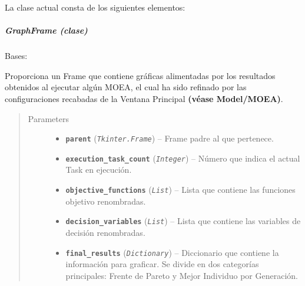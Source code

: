 \documentclass[letterpaper,10pt,english]{sphinxmanual}
\begin{document}
La clase actual consta de los siguientes elementos:


\subparagraph{GraphFrame (clase)}
\label{View/Additional/ResultsGrapher/GraphFrame:graphframe-clase}\label{View/Additional/ResultsGrapher/GraphFrame::doc}\label{View/Additional/ResultsGrapher/GraphFrame:module-View.Additional.ResultsGrapher.GraphFrame}

\begin{fulllineitems}
\label{View/Additional/ResultsGrapher/GraphFrame:View.Additional.ResultsGrapher.GraphFrame.GraphFrame}
Bases: 

Proporciona un Frame que contiene gráficas alimentadas por los resultados obtenidos
al ejecutar algún MOEA, el cual ha sido refinado por las configuraciones
recabadas de la Ventana Principal \textbf{(véase Model/MOEA)}.
\begin{quote}\begin{description}
\item[{Parameters}] \leavevmode\begin{itemize}
\item {} 
\textbf{\texttt{parent}} (\emph{\texttt{Tkinter.Frame}}) -- Frame padre al que pertenece.

\item {} 
\textbf{\texttt{execution\_task\_count}} (\emph{\texttt{Integer}}) -- Número que indica el actual Task en ejecución.

\item {} 
\textbf{\texttt{objective\_functions}} (\emph{\texttt{List}}) -- Lista que contiene las funciones objetivo renombradas.

\item {} 
\textbf{\texttt{decision\_variables}} (\emph{\texttt{List}}) -- Lista que contiene las variables de decisión renombradas.

\item {} 
\textbf{\texttt{final\_results}} (\emph{\texttt{Dictionary}}) -- Diccionario que contiene la información para graficar. Se divide en dos categorías principales:
Frente de Pareto y Mejor Individuo por Generación.

\end{itemize}


\end{description}
\end{quote}
\end{fulllineitems}
\end{document}
